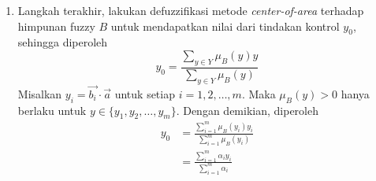 \begin{enumerate}
\begin{align*}
\begin{dcases}
        0\text{,} & &&y \text{ lainnya}
        \end{dcases}
    \end{align*}
    Dengan demikian, $B$ merupakan himpunan fuzzy diskrit.
    \item Langkah terakhir, lakukan defuzzifikasi metode \emph{center-of-area} terhadap himpunan fuzzy $B$ untuk mendapatkan nilai dari tindakan kontrol $y_0$, sehingga diperoleh
    \[ y_0 = \displaystyle \frac{\displaystyle\sum_{y \in Y} \mu_B(y)y}{\displaystyle\sum_{y \in Y} \mu_B(y)} \]
    Misalkan $y_i = \Vec{b_i}\cdot\Vec{a}$ untuk setiap $i=1,2,\ldots,m$. Maka $\mu_B(y)>0$ hanya berlaku untuk $y \in \{y_1,y_2,\ldots,y_m\}$. Dengan demikian, diperoleh
    \begin{align*}
        y_0 &= \displaystyle \frac{\displaystyle\sum_{i=1}^m \mu_B(y_i)y_i}{\displaystyle\sum_{i=1}^m \mu_B(y_i)}\\
         &= \displaystyle \frac{\displaystyle\sum_{i=1}^m \alpha_i y_i}{\displaystyle\sum_{i=1}^m \alpha_i}
    \end{align*}
\end{enumerate}

